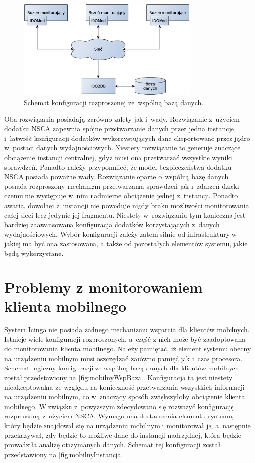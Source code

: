 \begin{figure}[h]
\centering
  \caption{Schemat konfiguracji rozproszonej ze~wspólną bazą danych.}
  \label{fig:rozpFull}
\includegraphics[width=0.8\textwidth]{img/icingaFull}
\end{figure}

Oba rozwiązania posiadają zarówno zalety jak i~wady. Rozwiązanie
z~użyciem dodatku NSCA zapewnia spójne przetwarzanie danych przez
jedna instancje i~łatwość konfiguracji dodatków wykorzystujących dane
eksportowane przez jądro w~postaci danych wydajnościowych. Niestety
rozwiązanie to generuje znaczące obciążenie instancji centralnej, gdyż
musi ona przetwarzać wszystkie wyniki sprawdzeń. Ponadto należy
przypomnieć, że model bezpieczeństwa dodatku NSCA posiada poważne
wady. Rozwiązanie oparte o~wspólną bazę danych posiada rozproszony
mechanizm przetwarzania sprawdzeń jak i~zdarzeń dzięki czemu nie
występuje w~nim nadmierne obciążenie jednej z~instancji. Ponadto
awaria, dowolnej z~instancji nie powoduje nigdy braku możliwości
monitorowania całej sieci lecz jedynie jej fragmentu. Niestety
w~rozwiązaniu tym konieczna jest bardziej zaawansowana konfiguracja
dodatków korzystających z~danych wydajnościowych. Wybór konfiguracji
zależy zatem silnie od infrastruktury w jakiej ma być ona zastosowana,
a także od pozostałych elementów systemu, jakie będą wykorzystane.


\section[Problemy][Problemy z monitorowaniem klienta mobilnego]{Problemy z monitorowaniem klienta mobilnego}

System Icinga nie posiada żadnego mechanizmu wsparcia dla klientów
mobilnych. Istnieje wiele konfiguracji rozproszonych, a~część z nich
może być zaadoptowana do monitorowania klienta mobilnego. Należy
pamiętać, iż element systemu obecny na urządzeniu mobilnym musi
oszczędzać zarówno pamięć jak i~czas procesora. Schemat logiczny
konfiguracji ze wspólną bazą danych dla klientów mobilnych został
przedstawiony na \ref{fig:mobilnyWspBaza}. Konfiguracja ta jest
niestety nieakceptowalna ze względu na konieczność przetwarzania
wszystkich informacji na urządzeniu mobilnym, co w~znaczący sposób
zwiększyłoby obciążenie klienta mobilnego.  W związku z~powyższym
zdecydowano się rozważyć konfigurację rozproszoną z~użyciem
NSCA. Wymaga ona dostarczenia elementu systemu, który będzie znajdował
się na urządzeniu mobilnym i monitorował je, a~następnie przekazywał,
gdy będzie to możliwe dane do instancji nadrzędnej, która będzie
prowadziła analizę otrzymanych danych. Schemat tej konfiguracji został
przedstawiony na \ref{fig:mobilnyInstancja}.


